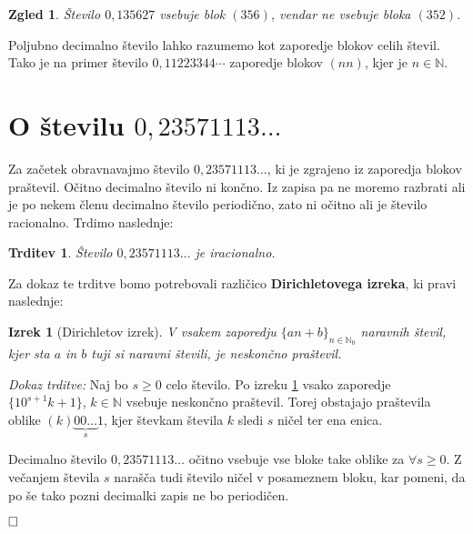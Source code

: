 \documentclass[a4paper,12pt]{article}
\def\N{\mathbb{N}} %
\def\qed{$\hfill\Box$}   %
\newtheorem{izrek}{Izrek}
\newtheorem{trditev}{Trditev}
\newtheorem{zgled}{Zgled}
\begin{document}
\begin{zgled}
    Število $0,135627$ vsebuje blok $(356)$, vendar ne vsebuje bloka $(352)$.
\end{zgled}

Poljubno decimalno število lahko razumemo kot zaporedje blokov celih števil.
Tako je na primer število $0,11223344 \cdots$ zaporedje blokov $(nn)$,
kjer je $n \in \N$.


\section{O številu $0,23571113 \dots$}

Za začetek obravnavajmo število $0,23571113 \dots$, ki je zgrajeno iz zaporedja
blokov praštevil. Očitno decimalno število ni končno. Iz zapisa pa ne moremo razbrati ali 
je po nekem členu decimalno število periodično, zato ni očitno ali je število racionalno.
Trdimo naslednje:

\begin{trditev}
    \label{trditev praštevila}
    Število $0,23571113 \dots$ je iracionalno.
\end{trditev}

Za dokaz te trditve bomo potrebovali različico \textbf{Dirichletovega izreka}, ki pravi naslednje:

\begin{izrek}[Dirichletov izrek]
    \label{Dirichletov izrek}
    V vsakem zaporedju $ \lbrace an + b \rbrace_{n \in \N_0}$ naravnih števil, kjer sta $a$ in $b$
    tuji si naravni števili, je neskončno praštevil.
\end{izrek}

\noindent
{\em Dokaz trditve:\/} Naj bo $s \geq 0$ celo število. Po izreku \ref{Dirichletov izrek} vsako zaporedje
$ \{10^{s+1}k + 1\}$, $k \in \N$ vsebuje neskončno praštevil. Torej obstajajo praštevila
oblike $(k)\underbrace{00 \dots}_{s}1$, kjer števkam števila $k$ sledi $s$ ničel ter ena enica. 

Decimalno število $0,23571113\dots$ očitno vsebuje vse bloke take oblike za $\forall s \geq 0$. Z večanjem števila
$s$ narašča tudi število ničel v posameznem bloku, kar pomeni, da po še tako pozni decimalki zapis ne bo periodičen.

\qed


\end{document}
